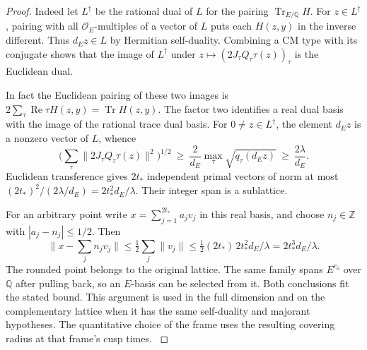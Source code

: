 \begin{proof}
Indeed let \(L^\dagger\) be the rational dual of \(L\) for
the pairing \(\operatorname{Tr}_{E/\mathbb Q}H\). For
\(z\in L^\dagger\), pairing with all \(\mathcal O_E\)-multiples
of a vector of \(L\) puts each \(H(z,y)\) in the inverse different.
Thus \(d_E z\in L\) by Hermitian self-duality. Combining a CM type
with its conjugate shows that the image of \(L^\dagger\) under
\(z\mapsto(2J_\tau Q_\tau\tau(z))_\tau\) is the Euclidean dual.

In fact the Euclidean pairing of these two images is
\(2\sum_\tau\operatorname{Re}\tau H(z,y)=\operatorname{Tr}H(z,y)\).
The factor two identifies a real dual basis with the image of the
rational trace dual basis. For \(0\ne z\in L^\dagger\), the element
\(d_Ez\) is a nonzero vector of \(L\), whence
\[
 \Big(\sum_\tau\|2J_\tau Q_\tau\tau(z)\|^2\Big)^{1/2}
 \ \ge\ \frac{2}{d_E}\max_\tau\sqrt{q_\tau(d_Ez)}
 \ \ge\ \frac{2\lambda}{d_E}.
\] Euclidean transference gives \(2t_*\)
independent primal vectors of norm at most
\((2t_*)^2/(2\lambda/d_E)=2t_*^2 d_E/\lambda\).
Their integer span is a sublattice.

For an arbitrary point write \(x=\sum_{j=1}^{2t_*}a_j v_j\) in
this real basis, and choose \(n_j\in\mathbb Z\) with
\(|a_j-n_j|\le1/2\). Then
\[
 \Big\|x-\sum_j n_jv_j\Big\|
 \le\tfrac12\sum_j\|v_j\|
 \le \tfrac12(2t_*)\,2t_*^2d_E/\lambda=2t_*^3 d_E/\lambda .
\]
The rounded point belongs to the original lattice. The same family spans \(E^{r_0}\)
over \(\mathbb Q\) after pulling back, so an \(E\)-basis can be
selected from it. Both conclusions fit the stated bound.
This argument is used in the full dimension and on the
complementary lattice when it has the same self-duality and
majorant hypotheses. The quantitative choice of the frame
uses the resulting covering radius at that frame's cusp times.
\cite{banaszczyk}\label{cor:slice-cm-transference-1}
\end{proof}
